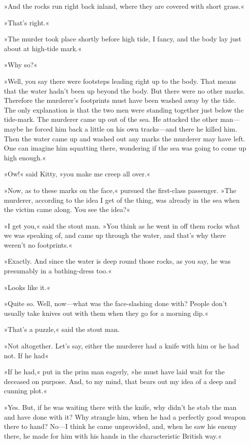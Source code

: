 »And the rocks run right back inland, where they are covered with short grass.«

»That's right.«

»The murder took place shortly before high tide, I fancy, and the body lay just about at high-tide mark.«

»Why so?«

»Well, you say there were footsteps leading right up to the body. That means that the water hadn't been up beyond the body. But there were no other marks. Therefore the murderer's footprints must have been washed away by the tide. The only explanation is that the two men were standing together just below the tide-mark. The murderer came up out of the sea. He attacked the other man—maybe he forced him back a little on his own tracks—and there he killed him. Then the water came up and washed out any marks the murderer may have left. One can imagine him squatting there, wondering if the sea was going to come up high enough.«

»Ow!« said Kitty, »you make me creep all over.«

»Now, as to these marks on the face,« pursued the first-class passenger. »The murderer, according to the idea I get of the thing, was already in the sea when the victim came along. You see the idea?«

»I get you,« said the stout man. »You think as he went in off them rocks what we was speaking of, and came up through the water, and that's why there weren't no footprints.«

»Exactly. And since the water is deep round those rocks, as you say, he was presumably in a bathing-dress too.«

»Looks like it.«

»Quite so. Well, now—what was the face-slashing done with? People don't usually take knives out with them when they go for a morning dip.«

»That's a puzzle,« said the stout man.

»Not altogether. Let's say, either the murderer had a knife with him or he had not. If he had\longdash«

»If he had,« put in the prim man eagerly, »he must have laid wait for the deceased on purpose. And, to my mind, that bears out my idea of a deep and cunning plot.«

»Yes. But, if he was waiting there with the knife, why didn't he stab the man and have done with it? Why strangle him, when he had a perfectly good weapon there to hand? No—I think he came unprovided, and, when he saw his enemy there, he made for him with his hands in the characteristic British way.«

